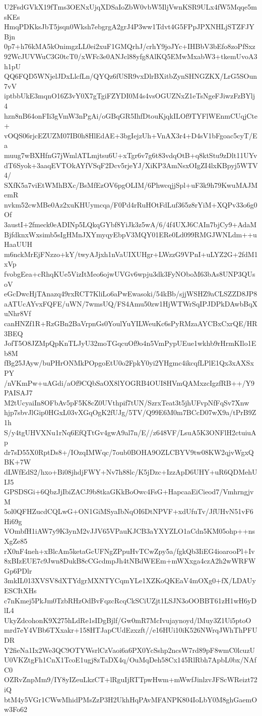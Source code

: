 U2FsdGVkX19fTms3OENxUjqXDSaIoZbW0vbW5IljVwnKSR9ULx4fW5Mqqe5msKEs
HmqPDKksJbT5jsqn0Wksh7ebgrgA2grJ4P3ww1Tdvt4G5FPpJPXNHLjSTZFJYBjn
0p7+h76kMA5kOnimgzLL0ei2xuF1GMQrhJ/crhY9joJYc+IHBbV3bEfo8zoPfSxz
92WcJUVWuC3G0tcT0/xWFc3e0ANJcl88yfg8AlKQ5EMwMxabW3+tkemUvoA3h1pU
QQ6FQD5WNjelJDxLlcfLn/QYQz6fUSR9vxDlrBXitbZynSHNGZKX/LrG5SOun7vV
iptbbUkE3mqnO16Z3vY0X7gTgiFZYDI0M4s4vsOGUZNxZ1eTsNgeFJiwzFzBYlj4
hzn8nB64onFIi3gVmW3nPgAi/oGBqGR5IhfDtouKjqkILOf9TYFlWEnmCUqjCte+
vOQS06rjcEZUZM07IB0h8HlEdAE+3bgIejzUh+VnAX3r4+D4sV1bFgoac5cyT/Ea
muug7wBXHfnG7jWmlATLmjtsu6U+xTgr6v7g6t83vdqOtB+q8ktStu9zDlt11UYv
dT6Syok+3aaqEVTOkAYfVSqF2Dcv5rjeYJ/XiKP3AmNsxOIgZI4lxKBpyj5WTV4/
SXfK5a7viEtWMhBXc/BsMfEzOV6pgOLIM/6PhwcqjjSpl+uF3k9h79KwuMAJMemR
nvkm52cwMBe0Az2xuKHUymcqa/F0Pd4rRuHOtFdLuf365z8rYiM+XQPv33o6g0Of
3austI+2fmeck0eADINp5LQkqGYbf8YiJk3z5wA/6/4f4UXJ6CAIn7bjCy9+AdaM
BjfdknxWxsimb5sIgHMnJXYmyqyEbpV3MQY01ERe0Ld099RMGJWNLdm++uHaaUUH
m6nckMrEjFNzzo+kY/twyAJjxh1nVaUIXUHgr+LWzzG9VPnI+uLYZ2G+2fdM1xVp
fvobgEea+cRhqKUe5VizItMeo6ojwUVGv6wpju3dk3FyNOboM63bAs8UNP3QUsoV
eGcDwcHjTAnazq49rxRCT7KliLo6aPwEwasoki/54kBb/sjjWSHZ9aCLSZZD8JP8
aATUcAYvxFQFE/uWN/7wmsUQ/FS4Amu50zw1HjWTWrSqIPJDPkDAwbBqXuNhr8Vf
canHNZf1R+RzGBn2BaVrpnGs0YoulYuYILWeuKc6sPyRMzaAYCBxCxrQE/HR3BEQ
JofT5O8JZMpQpKnTLJyU32moTGqcuOf9o4n5VmPypUEue1wkhb9rHrmKIlo1Eb8M
fBg25JAyw/buPHrONMkPOpgoEtU0o2FpkY0yi2YHgmc4ikcqfLPlE1Qx3xAXSxPY
/nVKmPw+uAGdi/aOf9CQbSaOX8lYOGRB4OUI8HVmQAMxzcIgzfRB++/Y9PAISAJ7
M2tUcyaiIn8OFbAv5pF5K8cZ0UVthpif7tUN/SzrxTeat3t5jhUFvpNfFqSv7Xnw
hjp7sbvJlGip0HGxL03vXGqOgK2fUJg/5TV/Q99E6M0m7BCcD07wX9a/tPrB9Z1h
S/y4tgUHVXNu1rNq6EfQTtGv4gwA9al7n/E//z648VF/LsuA5K3ONFlH2ctuiuAp
dr7sD55X0RptDs8+/IOzqIMWqc/7oub0BOHA9OZLCBYV9tw08KW2qjvWgxQBK+7W
dLWfEdS2/hxo+Bi08jhdjFWY+Nv7h88lc/K5jDzc+IzzApD6UHY+uR6QDMehUIJ5
GPSDSGi+6QbzJjIbiZACJ9b8tkaGKkBoOwc4FsG+HapcaaEiCieod7/VmhrngjvM
5ol0QFHZucdCQLwG+ON1GiMSyaIbNqOI6DtNPVF+xdUfuTv/JfUHvN51vF6Hi69g
VOmbfH1iAW7y9K3ynM2vJJV65VPauKJCB3aYXYZLO1aCdn5KM05ohp++nsXgZe85
rX0nF4neh+xBlcAm5ketaGcUFNgZPpuHvTCwZpy5a/fgkQb3IiEG4ioarooPl+Iv
8xBIzEUE7c9Jwn8DukB8cCGcdmpJh4tNBdWEEm+mWXxga4czA2h2wWRFWGp6PDlr
3mkIL013XVSV8dXTYdgrMXNTYCqmYLe1XZKoQKEaV4mOXg0+fX/LDAUyESCItXHs
c7nKmej5PkJm0TzbRHzOdBvFqzcRcqCkSCiUZjt1LSJN3oOOBBT61zH1wH6yDlL4
UkyZdcohonK9X275hLdRe1sIDgBjlf/Gw0mR7McIvujaynoyd/lMuy3Z1Ui5ptoO
mrd7eY4VBb6TXxakr+158HTJapCUdEzxzft//e16HUi10iK526NWrqJWhThPFUDR
Y2fieNa1Ix2We3QC9OTYWsrlCzVaoi6a6PX0YcSshp2ncsW7rd89pF8wmC0lcuzU
U0VKZtgFh1CnX1TcoE1ugj8zTaDX4q/OuMqDeh58Cx145RlRbh7ApbL0bx/NAfC0
OZRvZnpMm9/IY8yIZeuLkzCT+lRguIjRTTpwHwm+mWwfJinlzvJFScWReizt72iQ
btM4y5VGr1CWwMhidPMsZzP3H2UkhHqPAvMFANPK804IoLbY0M8ghGaemOw3Fo62
